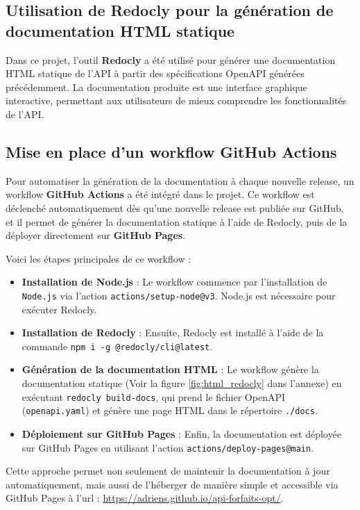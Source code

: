 \documentclass[11pt]{article}
\begin{document}
		\subsection{Utilisation de Redocly pour la génération de documentation HTML statique}
		\label{subsec:redocly}
		
		Dans ce projet, l'outil \textbf{Redocly} a été utilisé pour générer une documentation HTML statique de l'API à partir des spécifications OpenAPI générées précédemment. La documentation produite est une interface graphique interactive, permettant aux utilisateurs de mieux comprendre les fonctionnalités de l'API.
		
		\subsection{Mise en place d'un workflow GitHub Actions}
		
		Pour automatiser la génération de la documentation à chaque nouvelle release, un workflow \textbf{GitHub Actions} a été intégré dans le projet. Ce workflow est déclenché automatiquement dès qu'une nouvelle release est publiée sur GitHub, et il permet de générer la documentation statique à l'aide de Redocly, puis de la déployer directement sur \textbf{GitHub Pages}.
		
		Voici les étapes principales de ce workflow :
		\begin{itemize}
			\item \textbf{Installation de Node.js} : Le workflow commence par l'installation de \texttt{Node.js} via l'action \texttt{actions/setup-node@v3}. Node.js est nécessaire pour exécuter Redocly.
			\item \textbf{Installation de Redocly} : Ensuite, Redocly est installé à l'aide de la commande \texttt{npm i -g @redocly/cli@latest}.
			\item \textbf{Génération de la documentation HTML} : Le workflow génère la documentation statique (Voir la figure \ref{fig:html_redocly} dans l'annexe) en exécutant \texttt{redocly build-docs}, qui prend le fichier OpenAPI (\texttt{openapi.yaml}) et génère une page HTML dans le répertoire \texttt{./docs}.
			\item \textbf{Déploiement sur GitHub Pages} : Enfin, la documentation est déployée sur GitHub Pages en utilisant l'action \texttt{actions/deploy-pages@main}.
		\end{itemize}
		
		Cette approche permet non seulement de maintenir la documentation à jour automatiquement, mais aussi de l'héberger de manière simple et accessible via GitHub Pages à l'url : \url{https://adriens.github.io/api-forfaits-opt/}.
		
\end{document}
